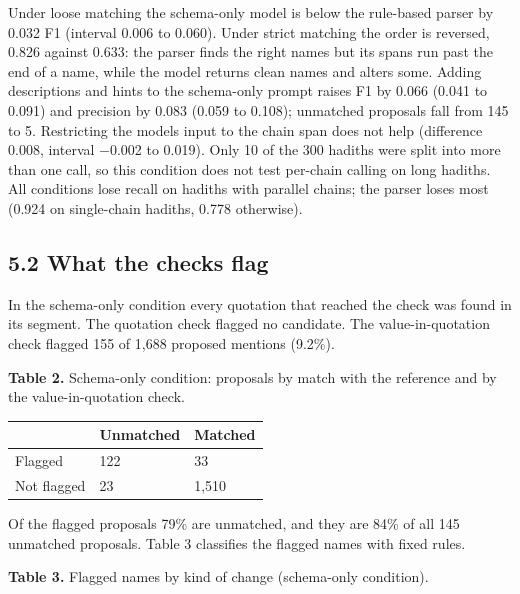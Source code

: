 \documentclass[
  english,
]{article}
\newcounter{none} %
\begin{document}
Under loose matching the schema-only model is below the rule-based
parser by 0.032 F1 (interval 0.006 to 0.060). Under strict matching the
order is reversed, 0.826 against 0.633: the parser finds the right names
but its spans run past the end of a name, while the model returns clean
names and alters some. Adding descriptions and hints to the schema-only
prompt raises F1 by 0.066 (0.041 to 0.091) and precision by 0.083 (0.059
to 0.108); unmatched proposals fall from 145 to 5. Restricting the
model\textquotesingle s input to the chain span does not help
(difference 0.008, interval −0.002 to 0.019). Only 10 of the 300 hadiths
were split into more than one call, so this condition does not test
per-chain calling on long hadiths. All conditions lose recall on hadiths
with parallel chains; the parser loses most (0.924 on single-chain
hadiths, 0.778 otherwise).

\subsection{5.2 What the checks flag}\label{what-the-checks-flag}

In the schema-only condition every quotation that reached the check was
found in its segment. The quotation check flagged no candidate. The
value-in-quotation check flagged 155 of 1,688 proposed mentions (9.2\%).

\textbf{Table 2.} Schema-only condition: proposals by match with the
reference and by the value-in-quotation check.

{\def\LTcaptype{none} %
\begin{longtable}[]{@{}lll@{}}
\toprule\noalign{}
& Unmatched & Matched \\
\midrule\noalign{}
\endhead
\bottomrule\noalign{}
\endlastfoot
Flagged & 122 & 33 \\
Not flagged & 23 & 1,510 \\
\end{longtable}
}

Of the flagged proposals 79\% are unmatched, and they are 84\% of all
145 unmatched proposals. Table 3 classifies the flagged names with fixed
rules.

\textbf{Table 3.} Flagged names by kind of change (schema-only
condition).
\end{document}
